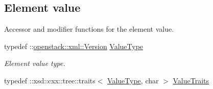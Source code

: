 \subsection*{Element value}
\label{_amgrp2ee2eae1a8c390ea033f241c027da8d6}
Accessor and modifier functions for the element value. \begin{DoxyCompactItemize}
\item 
\hypertarget{classopenstack_1_1xml_1_1Version___ad9142e3337b5fcddf697907855025c76}{
typedef ::\hyperlink{classopenstack_1_1xml_1_1Version}{openstack::xml::Version} \hyperlink{classopenstack_1_1xml_1_1Version___ad9142e3337b5fcddf697907855025c76}{ValueType}}
\label{classopenstack_1_1xml_1_1Version___ad9142e3337b5fcddf697907855025c76}

\begin{DoxyCompactList}\small\item\em Element value type. \item\end{DoxyCompactList}\item 
\hypertarget{classopenstack_1_1xml_1_1Version___a17b8f00b750cd3f50973783d3c25ef9e}{
typedef ::xsd::cxx::tree::traits$<$ \hyperlink{classopenstack_1_1xml_1_1Version}{ValueType}, char $>$ \hyperlink{classopenstack_1_1xml_1_1Version___a17b8f00b750cd3f50973783d3c25ef9e}{ValueTraits}}
\label{classopenstack_1_1xml_1_1Version___a17b8f00b750cd3f50973783d3c25ef9e}


\end{DoxyCompactItemize}
